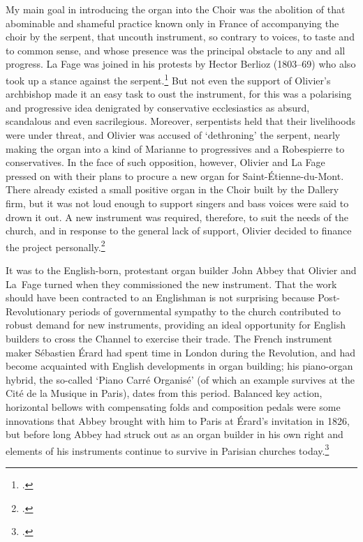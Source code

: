   {\cite[141 n.~1]{LaFagereproductionlivresplainchant1853}}
{
My main goal in introducing the organ into the Choir was the abolition of that abominable and shameful practice known only in France of accompanying the choir by the serpent, that uncouth instrument, so contrary to voices, to taste and to common sense, and whose presence was the principal obstacle to any and all progress.
}
\noindent
La Fage was joined in his protests by Hector Berlioz (1803--69) who also took up a stance against the serpent.\footcite[163]{Girodmusiquereligieuse1855}
But not even the support of Olivier's archbishop made it an easy task to oust the instrument, for this was a polarising and progressive idea denigrated by conservative ecclesiastics as absurd, scandalous and even sacrilegious.
Moreover, serpentists held that their livelihoods were under threat, and Olivier was accused of `dethroning' the serpent, nearly making the organ into a kind of Marianne to progressives and a Robespierre to conservatives.
In the face of such opposition, however, Olivier and La Fage pressed on with their plans to procure a new organ for Saint-Étienne-du-Mont.
There already existed a small positive organ in the Choir built by the Dallery firm, but it was not loud enough to support singers and bass voices were said to drown it out.
A new instrument was required, therefore, to suit the needs of the church, and in response to the general lack of support,  Olivier decided to finance the project personally.\footcite[170--77]{BouclonHistoiremonseigneurOlivier1855}

It was to the English-born, protestant organ builder John Abbey that Olivier and La~Fage turned when they commissioned the new instrument.
That the work should have been contracted to an Englishman is not surprising because Post-Revolutionary periods of governmental sympathy to the church contributed to robust demand for new instruments, providing an ideal opportunity for English builders to cross the Channel to exercise their trade.
The French instrument maker Sébastien Érard had spent time in London during the Revolution, and had become acquainted with English developments in organ building; his piano-organ hybrid, the so-called `Piano Carré Organisé' (of which an example survives at the Cité de la Musique in Paris), dates from this period.
Balanced key action, horizontal bellows with compensating folds and composition pedals were some innovations that Abbey brought with him to Paris at Érard's invitation in 1826, but before long Abbey had struck out as an organ builder in his own right and elements of his instruments continue to survive in Parisian churches today.\footcite[223]{BicknellHistoryEnglishOrgan1999}

